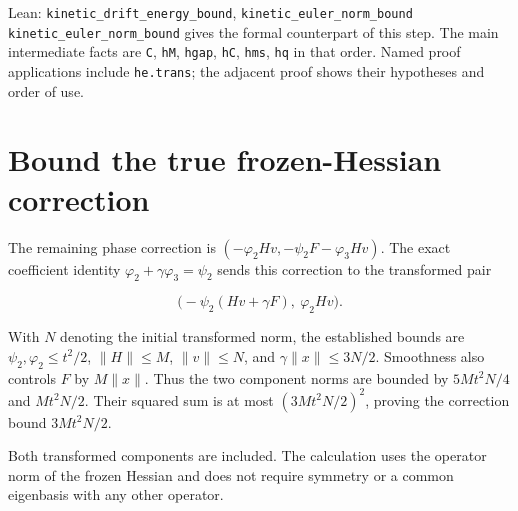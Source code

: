 \documentclass[11pt,a4paper]{article}
\begin{document}
\begin{leanbox}{Lean: \texttt{kinetic\_\allowbreak{}drift\_\allowbreak{}energy\_\allowbreak{}bound}, \texttt{kinetic\_\allowbreak{}euler\_\allowbreak{}norm\_\allowbreak{}bound}}
\texttt{kinetic\_\allowbreak{}euler\_\allowbreak{}norm\_\allowbreak{}bound} gives the formal counterpart of this step. The main intermediate facts are \texttt{C}, \texttt{h\allowbreak{}M}, \texttt{hgap}, \texttt{h\allowbreak{}C}, \texttt{hms}, \texttt{hq} in that order. Named proof applications include \texttt{he.\allowbreak{}trans}; the adjacent proof shows their hypotheses and order of use.
\end{leanbox}

\section{\texorpdfstring{Bound the true frozen-Hessian correction}{Bound the true frozen-Hessian correction}}


The remaining phase correction is \((-\varphi_2Hv,-\psi_2F-\varphi_3Hv)\). The exact coefficient identity \(\varphi_2+\gamma\varphi_3=\psi_2\) sends this correction to the transformed pair

\[\bigl(-\psi_2(Hv+\gamma F),\ \varphi_2Hv\bigr).\]

With \(N\) denoting the initial transformed norm, the established bounds are \(\psi_2,\varphi_2\le t^2/2\), \(\|H\|\le M\), \(\|v\|\le N\), and \(\gamma\|x\|\le3N/2\). Smoothness also controls \(F\) by \(M\|x\|\). Thus the two component norms are bounded by \(5Mt^2N/4\) and \(Mt^2N/2\). Their squared sum is at most \((3Mt^2N/2)^2\), proving the correction bound \(3Mt^2N/2\).



Both transformed components are included. The calculation uses the operator norm of the frozen Hessian and does not require symmetry or a common eigenbasis with any other operator.
\end{document}
